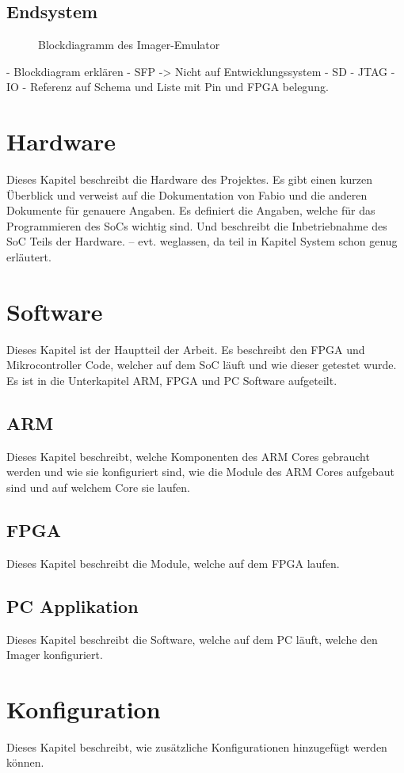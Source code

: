 \documentclass{article}
\begin{document}
\subsection{Endsystem}
\begin{figure}[tb]
    \caption{Blockdiagramm des Imager-Emulator}
    \label{fig:bd_top}
\end{figure}
- Blockdiagram erklären
    - SFP
    -> Nicht auf Entwicklungssystem
    - SD
    - JTAG
    - IO
- Referenz auf Schema und Liste mit Pin und FPGA belegung.

\section{Hardware}
Dieses Kapitel beschreibt die Hardware des Projektes. Es gibt einen kurzen Überblick und verweist auf die Dokumentation von Fabio und die anderen Dokumente für genauere Angaben. Es definiert die Angaben, welche für das Programmieren des SoCs wichtig sind. Und beschreibt die Inbetriebnahme des SoC Teils der Hardware.
-- evt. weglassen, da teil in Kapitel System schon genug erläutert.

\section{Software}
Dieses Kapitel ist der Hauptteil der Arbeit. Es beschreibt den FPGA und Mikrocontroller Code, welcher auf dem SoC läuft und wie dieser getestet wurde. Es ist in die Unterkapitel ARM, FPGA und PC Software aufgeteilt.
\subsection{ARM}
Dieses Kapitel beschreibt, welche Komponenten des ARM Cores gebraucht werden und wie sie konfiguriert sind, wie die Module des ARM Cores aufgebaut sind und auf welchem Core sie laufen.
\subsection{FPGA}
Dieses Kapitel beschreibt die Module, welche auf dem FPGA laufen.
\subsection{PC Applikation}
Dieses Kapitel beschreibt die Software, welche auf dem PC läuft, welche den Imager konfiguriert.


\section{Konfiguration}
Dieses Kapitel beschreibt, wie zusätzliche Konfigurationen hinzugefügt werden können.
\end{document}
